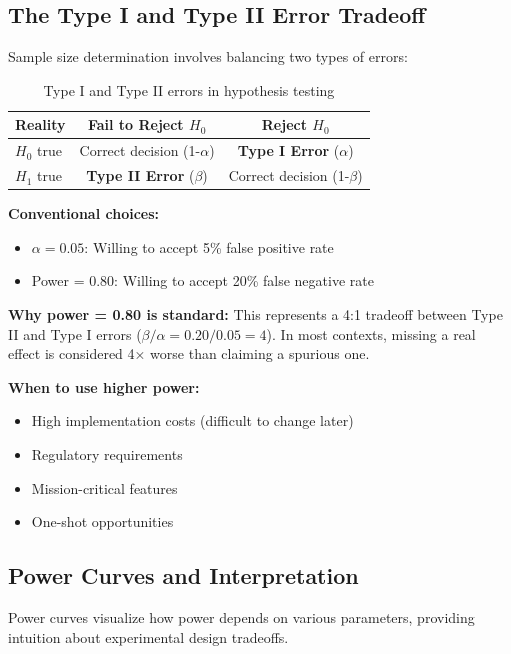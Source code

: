 \subsection{The Type I and Type II Error Tradeoff}

Sample size determination involves balancing two types of errors:

\begin{table}[h]
\centering
\begin{tabular}{lcc}
\hline
\textbf{Reality} & \textbf{Fail to Reject $H_0$} & \textbf{Reject $H_0$} \\
\hline
$H_0$ true & Correct decision (1-$\alpha$) & \textbf{Type I Error} ($\alpha$) \\
$H_1$ true & \textbf{Type II Error} ($\beta$) & Correct decision (1-$\beta$) \\
\hline
\end{tabular}
\caption{Type I and Type II errors in hypothesis testing}
\end{table}

\textbf{Conventional choices:}
\begin{itemize}
    \item $\alpha = 0.05$: Willing to accept 5\% false positive rate
    \item Power = 0.80: Willing to accept 20\% false negative rate
\end{itemize}

\textbf{Why power = 0.80 is standard:} This represents a 4:1 tradeoff between Type II and Type I errors ($\beta/\alpha = 0.20/0.05 = 4$). In most contexts, missing a real effect is considered 4× worse than claiming a spurious one.

\textbf{When to use higher power:}
\begin{itemize}
    \item High implementation costs (difficult to change later)
    \item Regulatory requirements
    \item Mission-critical features
    \item One-shot opportunities
\end{itemize}

\subsection{Power Curves and Interpretation}

Power curves visualize how power depends on various parameters, providing intuition about experimental design tradeoffs.

